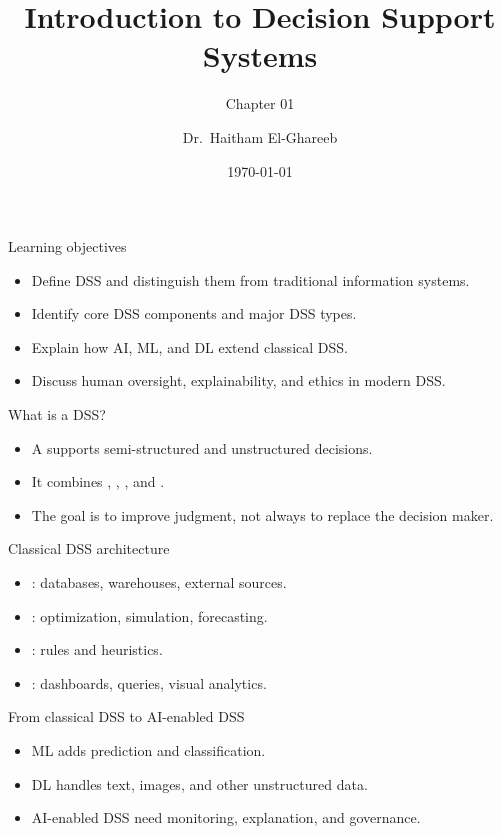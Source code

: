 \documentclass[aspectratio=169,11pt]{beamer}
\title[DSS Introduction]{Introduction to Decision Support Systems}
\subtitle{Chapter 01}
\author{Dr.\ Haitham El-Ghareeb}
\institute{Faculty of Computers and Information Sciences}
\date{\today}
\begin{document}
\begin{frame}
  \titlepage
\end{frame}

\begin{frame}{Learning objectives}
  \begin{itemize}
    \item Define DSS and distinguish them from traditional information systems.
    \item Identify core DSS components and major DSS types.
    \item Explain how AI, ML, and DL extend classical DSS.
    \item Discuss human oversight, explainability, and ethics in modern DSS.
  \end{itemize}
\end{frame}

\begin{frame}{What is a DSS?}
  \begin{itemize}
    \item A  supports semi-structured and
    unstructured decisions.
    \item It combines , , ,
    and .
    \item The goal is to improve judgment, not always to replace the decision
    maker.
  \end{itemize}
\end{frame}

\begin{frame}{Classical DSS architecture}
  \begin{itemize}
    \item {}: databases, warehouses, external sources.
    \item {}: optimization, simulation, forecasting.
    \item {}: rules and heuristics.
    \item {}: dashboards, queries, visual analytics.
  \end{itemize}
\end{frame}

\begin{frame}{From classical DSS to AI-enabled DSS}
  \begin{itemize}
    \item ML adds prediction and classification.
    \item DL handles text, images, and other unstructured data.
    \item AI-enabled DSS need monitoring, explanation, and governance.
  \end{itemize}
\end{frame}
\end{document}
